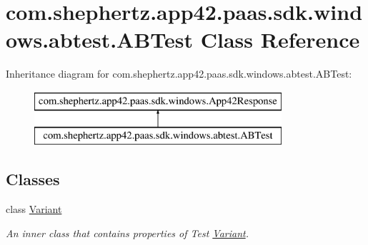\hypertarget{classcom_1_1shephertz_1_1app42_1_1paas_1_1sdk_1_1windows_1_1abtest_1_1_a_b_test}{\section{com.\+shephertz.\+app42.\+paas.\+sdk.\+windows.\+abtest.\+A\+B\+Test Class Reference}
\label{classcom_1_1shephertz_1_1app42_1_1paas_1_1sdk_1_1windows_1_1abtest_1_1_a_b_test}
}
Inheritance diagram for com.\+shephertz.\+app42.\+paas.\+sdk.\+windows.\+abtest.\+A\+B\+Test\+:\begin{figure}[H]
\begin{center}
\leavevmode
\includegraphics[height=2.000000cm]{classcom_1_1shephertz_1_1app42_1_1paas_1_1sdk_1_1windows_1_1abtest_1_1_a_b_test}
\end{center}
\end{figure}
\subsection*{Classes}
\begin{DoxyCompactItemize}
\item 
class \hyperlink{classcom_1_1shephertz_1_1app42_1_1paas_1_1sdk_1_1windows_1_1abtest_1_1_a_b_test_1_1_variant}{Variant}
\begin{DoxyCompactList}\small\item\em An inner class that contains properties of Test \hyperlink{classcom_1_1shephertz_1_1app42_1_1paas_1_1sdk_1_1windows_1_1abtest_1_1_a_b_test_1_1_variant}{Variant}. \end{DoxyCompactList}\end{DoxyCompactItemize}
